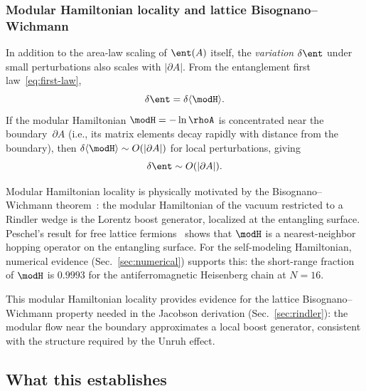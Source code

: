 \subsubsection{Modular Hamiltonian locality and lattice Bisognano--Wichmann}
\label{sec:delta-s}

In addition to the area-law scaling of $\ent(A)$ itself, the
\emph{variation} $\delta\ent$ under small perturbations also scales
with $|\partial A|$. From the entanglement first
law~\eqref{eq:first-law},
\begin{equation}
  \delta\ent = \delta\langle\modH\rangle.
  \label{eq:delta-s-modH}
\end{equation}
If the modular Hamiltonian $\modH = -\ln\rhoA$ is concentrated near
the boundary~$\partial A$ (i.e., its matrix elements decay rapidly
with distance from the boundary), then
$\delta\langle\modH\rangle \sim O(|\partial A|)$ for local
perturbations, giving
\begin{equation}
  \delta\ent \sim O(|\partial A|).
  \label{eq:delta-s-boundary}
\end{equation}

Modular Hamiltonian locality is physically motivated by the
Bisognano--Wichmann theorem~\cite{BisognanoWichmann1976}: the modular
Hamiltonian of the vacuum restricted to a Rindler wedge is the Lorentz
boost generator, localized at the entangling surface.  Peschel's result
for free lattice fermions~\cite{Peschel2003} shows that $\modH$ is a
nearest-neighbor hopping operator on the entangling surface.  For the
self-modeling Hamiltonian, numerical evidence (Sec.~\ref{sec:numerical})
supports this: the short-range fraction of $\modH$ is $0.9993$ for the
antiferromagnetic Heisenberg chain at $N = 16$.

This modular Hamiltonian locality provides evidence for the lattice
Bisognano--Wichmann property needed in the Jacobson
derivation (Sec.~\ref{sec:rindler}): the modular flow near the
boundary approximates a local boost generator, consistent with the
structure required by the Unruh effect.

\subsection{What this establishes}
\label{sec:area-summary}


